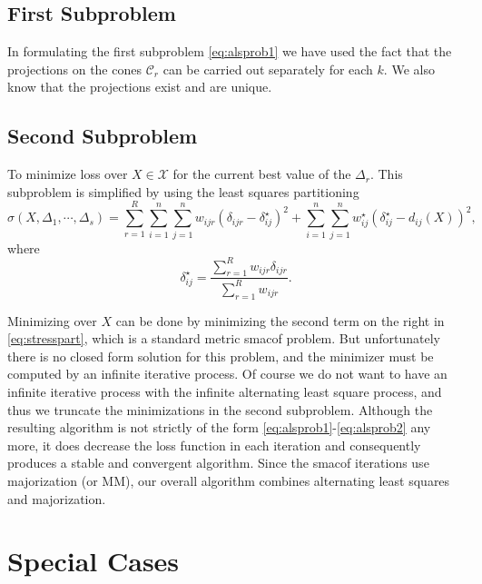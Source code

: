 \documentclass[
  12pt,
]{article}
\begin{document}
\subsection{First Subproblem}\label{first-subproblem}

In formulating the first subproblem \eqref{eq:alsprob1} we have used the fact that the projections on the cones \(\mathcal{C}_r\) can be carried out separately for each \(k\). We also know that the projections exist and are unique.

\subsection{Second Subproblem}\label{second-subproblem}

To minimize loss over \(X\in\mathcal{X}\) for the current best value of the \(\Delta_r\). This subproblem is simplified by using the least squares partitioning
\begin{equation}
\sigma(X,\Delta_1,\cdots,\Delta_s)=\sum_{r=1}^R\sum_{i=1}^n\sum_{j=1}^nw_{ijr}(\delta_{ijr}-\delta_{ij}^\star)^2+\sum_{i=1}^n\sum_{j=1}^nw_{ij}^\star(\delta_{ij}^\star-d_{ij}(X))^2,
\label{eq:stresspart}
\end{equation}
where
\begin{equation}
\delta_{ij}^\star=\frac{\sum_{r=1}^R w_{ijr}\delta_{ijr}}{\sum_{r=1}^R w_{ijr}}.
\label{eq:deltastardef}
\end{equation}

Minimizing over \(X\) can be done by minimizing the second term on the right in
\eqref{eq:stresspart}, which is a standard metric smacof problem. But unfortunately there is no closed form solution for this problem, and the
minimizer must be computed by an infinite iterative process. Of course
we do not want to have an infinite iterative process with the infinite alternating least square process, and thus we truncate the minimizations
in the second subproblem. Although the resulting algorithm is not
strictly of the form \eqref{eq:alsprob1}-\eqref{eq:alsprob2} any more, it does
decrease the loss function in each iteration and consequently
produces a stable and convergent algorithm. Since the smacof iterations
use majorization (or MM), our overall algorithm combines alternating
least squares and majorization.

\section{Special Cases}\label{special-cases}
\end{document}
